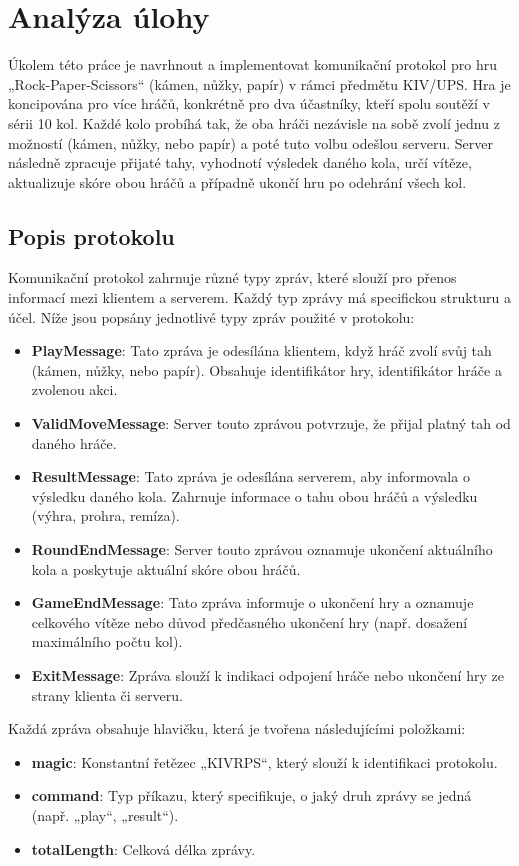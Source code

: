 \documentclass[12pt, a4paper]{article}
\begin{document}
\section{Analýza úlohy}

Úkolem této práce je navrhnout a implementovat komunikační protokol pro hru „Rock-Paper-Scissors“ (kámen, nůžky, papír) v rámci předmětu KIV/UPS. Hra je koncipována pro více hráčů, konkrétně pro dva účastníky, kteří spolu soutěží v sérii 10 kol. Každé kolo probíhá tak, že oba hráči nezávisle na sobě zvolí jednu z možností (kámen, nůžky, nebo papír) a poté tuto volbu odešlou serveru. Server následně zpracuje přijaté tahy, vyhodnotí výsledek daného kola, určí vítěze, aktualizuje skóre obou hráčů a případně ukončí hru po odehrání všech kol.

\subsection{Popis protokolu}

Komunikační protokol zahrnuje různé typy zpráv, které slouží pro přenos informací mezi klientem a serverem. Každý typ zprávy má specifickou strukturu a účel. Níže jsou popsány jednotlivé typy zpráv použité v protokolu:

\begin{itemize}
    \item \textbf{PlayMessage}: Tato zpráva je odesílána klientem, když hráč zvolí svůj tah (kámen, nůžky, nebo papír). Obsahuje identifikátor hry, identifikátor hráče a zvolenou akci.
    \item \textbf{ValidMoveMessage}: Server touto zprávou potvrzuje, že přijal platný tah od daného hráče.
    \item \textbf{ResultMessage}: Tato zpráva je odesílána serverem, aby informovala o výsledku daného kola. Zahrnuje informace o tahu obou hráčů a výsledku (výhra, prohra, remíza).
    \item \textbf{RoundEndMessage}: Server touto zprávou oznamuje ukončení aktuálního kola a poskytuje aktuální skóre obou hráčů.
    \item \textbf{GameEndMessage}: Tato zpráva informuje o ukončení hry a oznamuje celkového vítěze nebo důvod předčasného ukončení hry (např. dosažení maximálního počtu kol).
    \item \textbf{ExitMessage}: Zpráva slouží k indikaci odpojení hráče nebo ukončení hry ze strany klienta či serveru.
\end{itemize}

Každá zpráva obsahuje hlavičku, která je tvořena následujícími položkami:
\begin{itemize}
    \item \textbf{magic}: Konstantní řetězec „KIVRPS“, který slouží k identifikaci protokolu.
    \item \textbf{command}: Typ příkazu, který specifikuje, o jaký druh zprávy se jedná (např. „play“, „result“).
    \item \textbf{totalLength}: Celková délka zprávy.
\end{itemize}
\end{document}
